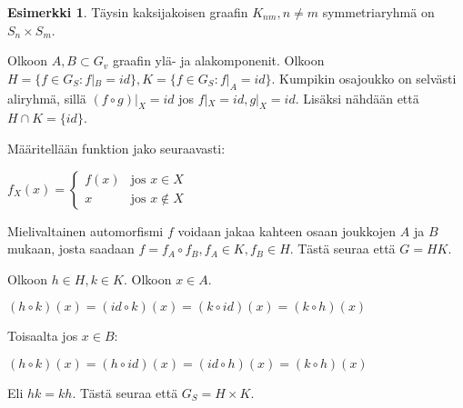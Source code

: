 \documentclass[a4paper, 12pt]{article}
\theoremstyle{definition}
\newtheorem{example}[mydef]{Esimerkki}
\theoremstyle{plain}
\begin{document}
\begin{example}
Täysin kaksijakoisen graafin $K_{nm}, n \neq m$ symmetriaryhmä on $S_n \times S_m$.

\begin{center}
\end{center}

Olkoon $A, B \subset G_v$ graafin ylä- ja alakomponenit. Olkoon $H = \{f \in G_S : f|_B = id\}, K = \{f \in G_S : f|_A = id\}$. Kumpikin osajoukko on selvästi aliryhmä, sillä $(f \circ g)|_X = id$ jos $f|_X = id, g|_X = id$. Lisäksi nähdään että $H \cap K = \{ id \}$.

Määritellään funktion jako seuraavasti:

\begin{center}
\begin{math}
f_X(x) =
\left\{
	\begin{array}{ll}
		f(x)  & \mbox{jos } x \in X \\
		x & \mbox{jos } x \notin X
	\end{array}
\right.
\end{math}
\end{center}

Mielivaltainen automorfismi $f$ voidaan jakaa kahteen osaan joukkojen $A$ ja $B$ mukaan, josta saadaan $f = f_A \circ f_B, f_A \in K, f_B \in H$. Tästä seuraa että $G = HK$.

Olkoon $h \in H, k \in K$. Olkoon $x \in A$. 
\begin{center}
\begin{math}
(h \circ k)(x) = (id \circ k)(x) = (k \circ id)(x) = (k \circ h)(x)
\end{math}
\end{center}
Toisaalta jos $x \in B$:
\begin{center}
\begin{math}
(h \circ k)(x) = (h \circ id)(x) = (id \circ h)(x) = (k \circ h)(x)
\end{math}
\end{center}

Eli $hk = kh$. Tästä seuraa että $G_S = H \times K$.
\end{example}
\end{document}

